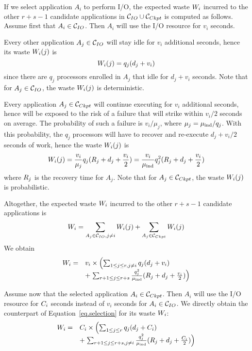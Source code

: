 If we select application $A_{i}$ to perform I/O, the expected waste $W_{i}$
incurred to the other $r+s-1$ candidate applications in  $\mathcal{C}_{IO} \cup
\mathcal{C}_{Ckpt}$ is computed as follows. Assume first that $A_{i} \in \mathcal{C}_{IO}$.
Then  $A_{i}$ will use the I/O resource for $v_{i}$ seconds.
\begin{compactitem}
%
  \item Every other application $A_{j} \in \mathcal{C}_{IO}$ will stay idle for $v_{i}$
  additional seconds, hence its waste $W_{i}(j)$ is $$W_{i}(j) = q_{j}
  (d_{j} + v_{i})$$ since there are $q_{j}$ processors enrolled in $A_{j}$ that
  idle for $d_{j} + v_{i}$ seconds. Note that for $A_{j} \in \mathcal{C}_{IO}$, the
  waste $W_{i}(j)$ is deterministic.
%
  \item Every application $A_{j} \in \mathcal{C}_{Ckpt}$ will continue executing for
  $v_{i}$ additional seconds, hence will be exposed to the risk of a failure
  that will strike within $v_{i}/2$ seconds on average. The probability of such
  a failure is $v_{i}/\mu_{j}$, where $\mu_{j} =
  \mu_{\text{ind}}/q_{j}$. With this
  probability, the $q_{j}$ processors will have to recover and re-execute $d_{j} +
  v_{i}/2$ seconds of work, hence the waste $W_{i}(j)$ is $$W_{i}(j) =
  \frac{v_{i}}{\mu_{j} } q_{j} (R_{j} + d_{j} + \frac{v_{i}}{2}) =
  \frac{v_{i}}{\mu_{\text{ind}}} q^{2}_{j} (R_{j} + d_{j} + \frac{v_{i}}{2})$$ where
  $R_{j}$ is the recovery time for $A_{j}$. Note that for $A_{j} \in
  \mathcal{C}_{Ckpt}$, the waste $W_{i}(j)$ is probabilistic.
%
 \end{compactitem}
 Altogether, the expected waste $W_{i}$ incurred
to the other $r+s-1$ candidate applications is
$$W_{i} = \sum_{A_{j} \in \mathcal{C}_{IO}, j\neq i} W_{i}(j) + \sum_{A_{j} \in \mathcal{C}_{Ckpt}} W_{i}(j)$$
We obtain
\begin{equation}
\label{eq.selection}
\begin{array}{ll}
 W_{i} = & v_{i} \times \left( \sum_{1 \leq j \leq r, j\neq i} q_{j} (d_{j} + v_{i}) \right.\\
& + \left. \sum_{r+1 \leq j \leq r+s}   \frac{q^{2}_{j}}{\mu_{\text{ind}}} (R_{j} + d_{j} + \frac{v_{i}}{2}) \right)
 \end{array}
\end{equation}

 Assume now that the selected application $A_{i} \in \mathcal{C}_{Ckpt}$. Then  $A_{i}$ will use the I/O resource for $C_{i}$ seconds instead of $v_{i}$ seconds for $A_{i} \in \mathcal{C}_{IO}$. We directly obtain the counterpart of Equation~\eqref{eq.selection} for its waste $W_{i}$:
 \begin{equation}
\label{eq.selection2}
 \begin{array}{ll}
 W_{i} = & C_{i} \times \left( \sum_{1 \leq j \leq r} q_{j} (d_{j} + C_{i}) \right.\\
& + \left. \sum_{r+1 \leq j \leq r+s, j\neq i}   \frac{q^{2}_{j}}{\mu_{\text{ind}}} (R_{j} + d_{j} + \frac{C_{i}}{2}) \right)
 \end{array}
\end{equation}

